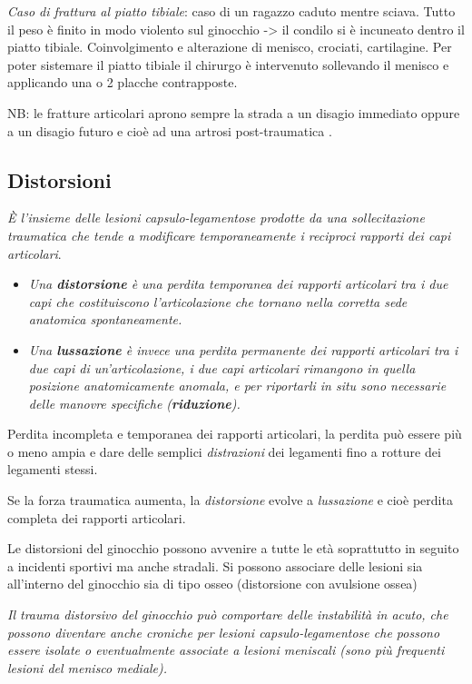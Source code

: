 \emph{Caso di frattura al piatto tibiale}: caso di un ragazzo caduto mentre sciava. Tutto il peso è finito in modo violento sul ginocchio -> il condilo si è incuneato dentro il piatto tibiale. Coinvolgimento e
alterazione di menisco, crociati, cartilagine. Per poter sistemare il piatto tibiale il chirurgo è intervenuto sollevando il menisco e applicando una o 2 placche contrapposte.

NB: le fratture articolari aprono sempre la strada a un disagio immediato oppure a un disagio futuro e cioè ad una artrosi post-traumatica .

\subsection{Distorsioni}

\emph{È l'insieme delle lesioni capsulo-legamentose prodotte da una sollecitazione traumatica che tende a modificare temporaneamente i reciproci rapporti dei capi articolari}.

\begin{itemize}
\item
  \emph{Una \textbf{distorsione} è una perdita temporanea dei rapporti articolari tra i due capi che costituiscono l'articolazione che tornano nella corretta sede anatomica spontaneamente.}
\item
  \emph{Una \textbf{lussazione} è invece una perdita permanente dei rapporti articolari tra i due capi di un'articolazione, i due capi articolari rimangono in quella posizione anatomicamente anomala, e per riportarli in situ sono necessarie delle manovre specifiche (\textbf{riduzione}).}
\end{itemize}

Perdita incompleta e temporanea dei rapporti articolari, la perdita può essere più o meno ampia e dare delle semplici \emph{distrazioni} dei legamenti fino a rotture dei legamenti stessi.

Se la forza traumatica aumenta, la \emph{distorsione} evolve a \emph{lussazione} e cioè perdita completa dei rapporti articolari.

Le distorsioni del ginocchio possono avvenire a tutte le età soprattutto in seguito a incidenti sportivi ma anche stradali. Si possono associare delle lesioni sia all'interno del ginocchio sia di tipo osseo (distorsione con avulsione ossea)

\emph{Il trauma distorsivo del ginocchio può comportare delle instabilità in acuto, che possono diventare anche croniche per lesioni capsulo-legamentose che possono essere isolate o eventualmente associate a lesioni meniscali (sono più frequenti lesioni del menisco mediale).}

